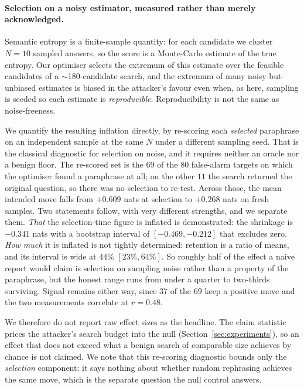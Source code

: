 \paragraph{Selection on a noisy estimator, measured rather than merely acknowledged.}
Semantic entropy is a finite-sample quantity: for each candidate we cluster $N{=}10$ sampled
answers, so the score is a Monte-Carlo estimate of the true entropy. Our optimiser selects the
extremum of this estimate over the feasible candidates of a $\sim$180-candidate search, and
the extremum of many noisy-but-unbiased estimates is biased in the attacker's favour even
when, as here, sampling is
seeded so each estimate is \emph{reproducible}. Reproducibility is not the same as
noise-freeness.

We quantify the resulting inflation directly, by re-scoring each \emph{selected} paraphrase on
an independent sample at the same $N$ under a different sampling seed. That is the classical
diagnostic for selection on noise, and it requires neither an oracle nor a benign floor. The
re-scored set is the $69$ of the $80$ false-alarm targets on which the optimiser found a
paraphrase at all; on the other $11$ the search returned the original question, so there was no
selection to re-test. Across those, the mean intended move falls from $+0.609$ nats at
selection to $+0.268$ nats on fresh samples. Two statements follow, with very different
strengths, and we separate them. \emph{That} the selection-time figure is inflated is
demonstrated: the shrinkage is $-0.341$ nats with a bootstrap interval of $[-0.469, -0.212]$
that excludes zero. \emph{How much} it is inflated is not tightly determined: retention is a
ratio of means, and its interval is wide at $44\%$ $[23\%, 64\%]$. So roughly half of the
effect a naive report would claim is selection on sampling noise rather than a property of the
paraphrase, but the honest range runs from under a quarter to two-thirds surviving. Signal
remains either way, since $37$ of the $69$ keep a positive move and the two measurements
correlate at $r{=}0.48$.

We therefore do not report raw effect sizes as the headline. The claim statistic prices the
attacker's search budget into the null (Section~\ref{sec:experiments}), so an effect that does
not exceed what a benign search of comparable size achieves by chance is not claimed. We note
that this re-scoring diagnostic bounds only the \emph{selection} component: it says nothing
about whether random rephrasing achieves the same move, which is the separate question the null
control answers.

